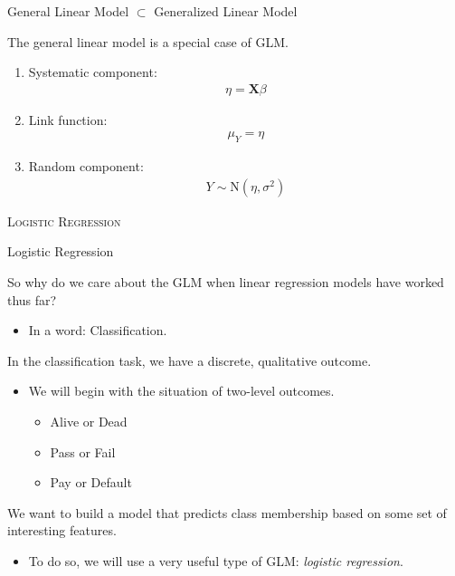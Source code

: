 \documentclass{beamer}\usepackage[]{graphicx}\usepackage[]{color}
\begin{document}

\begin{frame}{General Linear Model $\subset$ Generalized Linear Model}
  
  The general linear model is a special case of GLM.
  \va  
  \begin{enumerate}
  \item Systematic component:
    \begin{align*}
      \eta = \mathbf{X} \beta
    \end{align*}
  \item Link function:
    \begin{align*}
      \mu_Y = \eta
    \end{align*}
  \item Random component:
    \begin{align*}
      Y \sim \text{N}(\eta, \sigma^2)
    \end{align*}
  \end{enumerate}
  
\end{frame}


\begin{frame}{}
  
  \begin{center}
    \Huge{\textsc{Logistic Regression}}
  \end{center}
  
\end{frame}


\begin{frame}{Logistic Regression}
  
  So why do we care about the GLM when linear regression models have worked
  thus far?  
  \vc
  \begin{itemize}
  \item In a word: Classification.
  \end{itemize}
  \vb
  In the classification task, we have a discrete, qualitative outcome.
  \vb
  \begin{itemize}
  \item We will begin with the situation of two-level outcomes.
    \vc
    \begin{itemize}
    \item Alive or Dead
    \item Pass or Fail
    \item Pay or Default
    \end{itemize}
  \end{itemize}
  \vb
  We want to build a model that predicts class membership based on some set of 
  interesting features.
  \vc
  \begin{itemize}
  \item To do so, we will use a very useful type of GLM: \emph{logistic 
    regression}.
  \end{itemize}
  
\end{frame}
\end{document}
